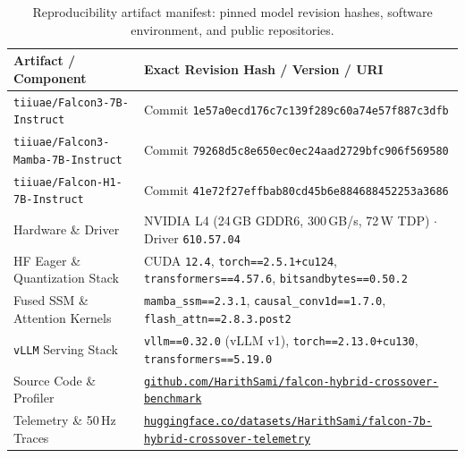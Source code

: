 \documentclass[10pt,a4paper]{article}
\begin{document}
\begin{table}[ht!]
\centering
\footnotesize
\setlength{\tabcolsep}{6pt}
\caption{Reproducibility artifact manifest: pinned model revision hashes, software environment, and public repositories.}
\label{tab:repro}
\begin{tabularx}{\textwidth}{@{}l>{\raggedright\arraybackslash}X@{}}
\toprule
\textbf{Artifact / Component} & \textbf{Exact Revision Hash / Version / URI} \\
\midrule
\texttt{tiiuae/Falcon3-7B-Instruct} & Commit \texttt{1e57a0ecd176c7c139f289c60a74e57f887c3dfb} \\
\texttt{tiiuae/Falcon3-Mamba-7B-Instruct} & Commit \texttt{79268d5c8e650ec0ec24aad2729bfc906f569580} \\
\texttt{tiiuae/Falcon-H1-7B-Instruct} & Commit \texttt{41e72f27effbab80cd45b6e884688452253a3686} \\
\midrule
Hardware \& Driver & NVIDIA L4 (24\,GB GDDR6, 300\,GB/s, 72\,W TDP) $\cdot$ Driver \texttt{610.57.04} \\
HF Eager \& Quantization Stack & CUDA \texttt{12.4}, \texttt{torch==2.5.1+cu124}, \texttt{transformers==4.57.6}, \texttt{bitsandbytes==0.50.2} \\
Fused SSM \& Attention Kernels & \texttt{mamba\_ssm==2.3.1}, \texttt{causal\_conv1d==1.7.0}, \texttt{flash\_attn==2.8.3.post2} \\
\texttt{vLLM} Serving Stack & \texttt{vllm==0.32.0} (vLLM v1), \texttt{torch==2.13.0+cu130}, \texttt{transformers==5.19.0} \\
\midrule
Source Code \& Profiler & \href{https://github.com/HarithSami/falcon-hybrid-crossover-benchmark}{\texttt{github.com/HarithSami/falcon-hybrid-crossover-benchmark}} \\
Telemetry \& 50\,Hz Traces & \href{https://huggingface.co/datasets/HarithSami/falcon-7b-hybrid-crossover-telemetry}{\texttt{huggingface.co/datasets/HarithSami/falcon-7b-hybrid-crossover-telemetry}} \\
\bottomrule
\end{tabularx}
\end{table}
\end{document}

